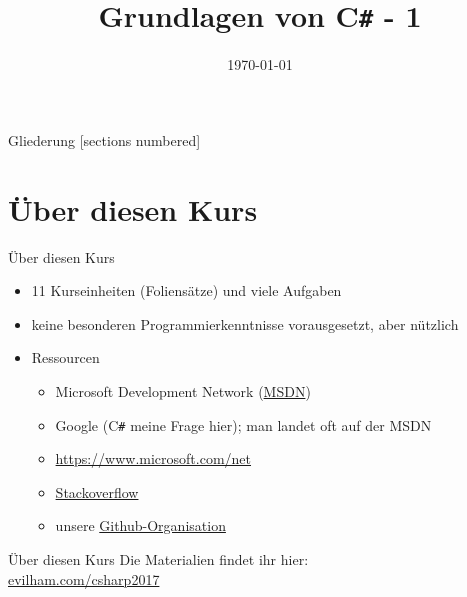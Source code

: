 



\title{Grundlagen von C\texttt{\#} - 1}
\date{\today}




\maketitle

\begin{frame}{Gliederung}
	[sections numbered]
	\tableofcontents
\end{frame}

\section{Über diesen Kurs}
\begin{frame}{Über diesen Kurs}
	\begin{itemize}
		\item 11 Kurseinheiten (Foliensätze) und viele Aufgaben
		\item keine besonderen Programmierkenntnisse vorausgesetzt, aber nützlich
		\item Ressourcen
		\begin{itemize}
			\item Microsoft Development Network (\href{https://msdn.microsoft.com}{MSDN})
			\item Google (C\texttt{\#} meine Frage hier); man landet oft auf der MSDN
			\item \href{https://www.microsoft.com/net}{https://www.microsoft.com/net}
			\item \href{http://stackoverflow.com/}{Stackoverflow}
			\item unsere \href{https://github.com/fsr}{Github-Organisation}
		\end{itemize}
	\end{itemize}
\end{frame}

\begin{frame}{Über diesen Kurs}
	\centering \normalsize Die Materialien findet ihr hier: \\
	\huge \href{https://evilham.com/csharp2017}{evilham.com/csharp2017}\\

\end{frame}

